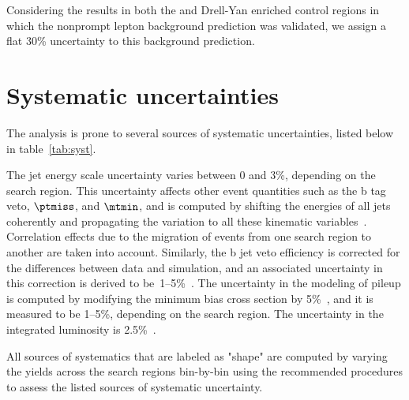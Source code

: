 Considering the results in both the \ttbar and Drell-Yan enriched control regions in which the nonprompt lepton background prediction was validated, we assign a flat 30\% uncertainty to this background prediction. 

\clearpage
\section{Systematic uncertainties}
The analysis is prone to several sources of systematic uncertainties, listed below in table~\ref{tab:syst}. 

The jet energy scale uncertainty varies between 0 and 3\%, depending on the search region. 
This uncertainty affects other event quantities such as the b tag veto, $\ptmiss$, and $\mtmin$, 
and is computed by shifting the energies of all jets coherently and propagating the variation to all these kinematic variables~\cite{jecDataMC}. 
Correlation effects due to the migration of events from one search region to another are taken into account. 
Similarly, the b jet veto efficiency is corrected for the differences between data and simulation, 
and an associated uncertainty in this correction is derived to be~1--5\%~\cite{btagSF}. 
The uncertainty in the modeling of pileup is computed by modifying the minimum bias cross section by 5\%~\cite{PUtwiki},
and it is measured to be 1--5\%, depending on the search region. 
The uncertainty in the integrated luminosity is 2.5\%~\cite{CMS-PAS-LUM-17-001}.

All sources of systematics that are labeled as "shape" are computed by varying the yields across the search regions 
bin-by-bin using the recommended procedures to assess the listed sources of systematic uncertainty.  

